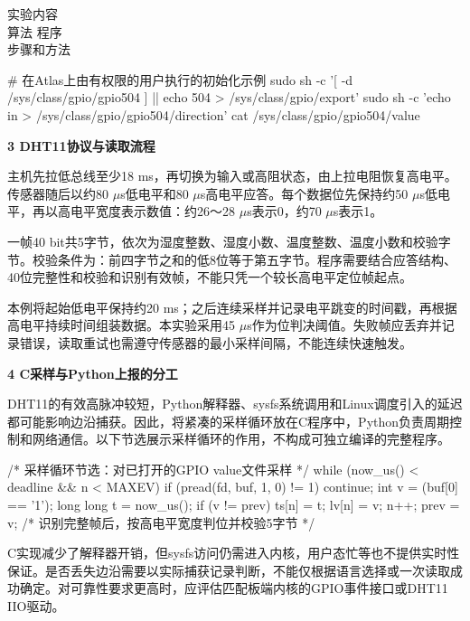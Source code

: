 \documentclass[UTF8,zihao=-4,a4paper]{ctexart}
\begin{document}
\begin{reprow}{实验内容\\
算法 程序\\
步骤和方法}
\begin{ReportCode}
# 在Atlas上由有权限的用户执行的初始化示例
sudo sh -c '[ -d /sys/class/gpio/gpio504 ] || echo 504 > /sys/class/gpio/export'
sudo sh -c 'echo in > /sys/class/gpio/gpio504/direction'
cat /sys/class/gpio/gpio504/value
\end{ReportCode}
\par\medskip
\noindent\textbf{3 DHT11协议与读取流程}\par\nobreak
主机先拉低总线至少18 ms，再切换为输入或高阻状态，由上拉电阻恢复高电平。传感器随后以约80 \ensuremath{\mu}s低电平和80 \ensuremath{\mu}s高电平应答。每个数据位先保持约50 \ensuremath{\mu}s低电平，再以高电平宽度表示数值：约26～28 \ensuremath{\mu}s表示0，约70 \ensuremath{\mu}s表示1。\par

一帧40 bit共5字节，依次为湿度整数、湿度小数、温度整数、温度小数和校验字节。校验条件为：前四字节之和的低8位等于第五字节。程序需要结合应答结构、40位完整性和校验和识别有效帧，不能只凭一个较长高电平定位帧起点。\par

本例将起始低电平保持约20 ms；之后连续采样并记录电平跳变的时间戳，再根据高电平持续时间组装数据。本实验采用45 \ensuremath{\mu}s作为位判决阈值。失败帧应丢弃并记录错误，读取重试也需遵守传感器的最小采样间隔，不能连续快速触发。\par

\par\medskip
\noindent\textbf{4 C采样与Python上报的分工}\par\nobreak
DHT11的有效高脉冲较短，Python解释器、sysfs系统调用和Linux调度引入的延迟都可能影响边沿捕获。因此，将紧凑的采样循环放在C程序中，Python负责周期控制和网络通信。以下节选展示采样循环的作用，不构成可独立编译的完整程序。\par

\begin{ReportCode}
/* 采样循环节选：对已打开的GPIO value文件采样 */
while (now_us() < deadline && n < MAXEV) {
    if (pread(fd, buf, 1, 0) != 1) continue;
    int v = (buf[0] == '1');
    long long t = now_us();
    if (v != prev) {
        ts[n] = t; lv[n] = v; n++; prev = v;
    }
}
/* 识别完整帧后，按高电平宽度判位并校验5字节 */
\end{ReportCode}
C实现减少了解释器开销，但sysfs访问仍需进入内核，用户态忙等也不提供实时性保证。是否丢失边沿需要以实际捕获记录判断，不能仅根据语言选择或一次读取成功确定。对可靠性要求更高时，应评估匹配板端内核的GPIO事件接口或DHT11 IIO驱动。\par


\end{reprow}
\end{document}
